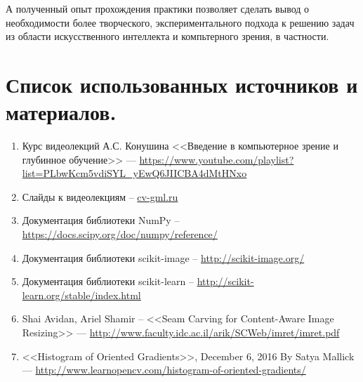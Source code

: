 \documentclass[a4paper, 12pt]{article}
\begin{document}
А полученный опыт прохождения практики позволяет сделать вывод о необходимости более творческого, экспериментального подхода к решению задач из области искусственного интеллекта и компьтерного зрения, в частности.

\newpage

\section*{Список использованных источников и материалов.}
\begin{enumerate}
	\item Курс видеолекций А.С. Конушина <<Введение в компьютерное зрение и глубинное обучение>> --- \url{https://www.youtube.com/playlist?list=PLbwKcm5vdiSYL_yEwQ6JIICBA4dMtHNxo}
	\item Слайды к видеолекциям -- \url{cv-gml.ru}
	\item Документация библиотеки NumPy -- \url{https://docs.scipy.org/doc/numpy/reference/}
	\item Документация библиотеки scikit-image -- \url{http://scikit-image.org/}
	\item Документация библиотеки scikit-learn -- \url{http://scikit-learn.org/stable/index.html}
	\item Shai Avidan, Ariel Shamir -- <<Seam Carving for Content-Aware Image Resizing>> --- \url{http://www.faculty.idc.ac.il/arik/SCWeb/imret/imret.pdf}
	\item <<Histogram of Oriented Gradients>>, December 6, 2016 By Satya Mallick --- \url{http://www.learnopencv.com/histogram-of-oriented-gradients/}
\end{enumerate}
\end{document}
